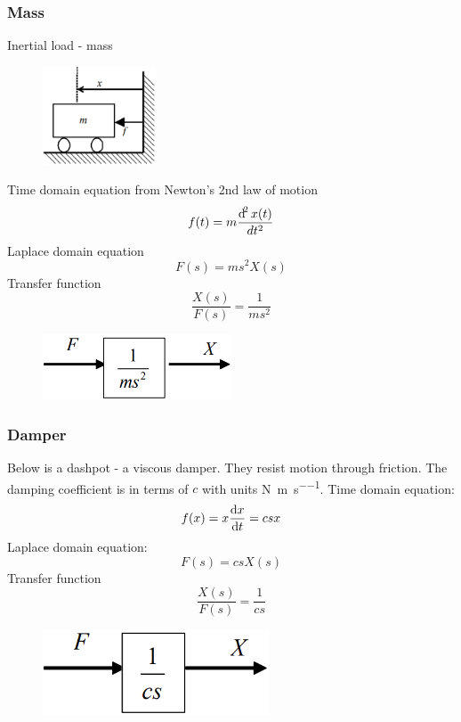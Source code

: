 \documentclass[class=report, crop=false, 12pt,a4paper, tikz, border=4mm]{standalone}
\begin{document}
\subsubsection{Mass}
Inertial load - mass
\begin{figure}[H]
  \centering
  \includegraphics[width = 0.3\textwidth]{../img/diagram2.png}
\end{figure}
Time domain equation from Newton's 2nd law of motion
\begin{equation}
  f(t) = m \frac{\dif^2x(t)}{dt^2}
\end{equation}
Laplace domain equation
\begin{equation}
  F(s) = ms^2 X(s)
\end{equation}
Transfer function
\begin{equation}
  \frac{X(s)}{F(s)} = \frac{1}{ms^2}
\end{equation}
\begin{figure}[H]
  \centering
  \includegraphics[width = 0.5\textwidth]{../img/blockdiagram13.png}
\end{figure}
\subsubsection{Damper}
Below is a dashpot - a viscous damper. They resist motion through friction. The damping coefficient is in terms of $c$ with units \si{\newton\per\meter\per\second}. Time domain equation:
\begin{equation}
  f(x) = x\frac{\dif x }{\dif t} = csx
\end{equation}
Laplace domain equation:
\begin{equation}
  F(s) = csX(s)
\end{equation}
Transfer function
\begin{equation}
  \frac{X(s)}{F(s)} = \frac{1}{cs}
\end{equation}
\begin{figure}[H]
  \centering
  \includegraphics[width = 0.6\textwidth]{../img/blockdiagram14.png}
\end{figure}
\end{document}
